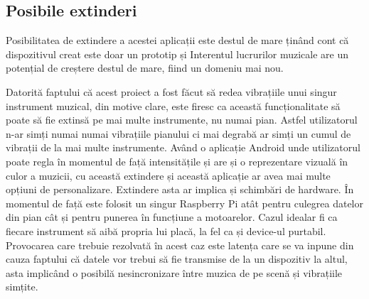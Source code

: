 \documentclass[../IoMusT.tex]{subfiles}
\begin{document}
\subsection{Posibile extinderi}
Posibilitatea de extindere a acestei aplicații este destul de mare ținând cont că dispozitivul creat este doar un prototip și Interentul lucrurilor muzicale are un potențial de creștere destul de mare, fiind un domeniu mai nou.
\\
\par Datorită faptului că acest proiect a fost făcut să redea vibrațiile unui singur instrument muzical, din motive clare, este firesc ca această funcționalitate să poate să fie extinsă pe mai multe instrumente, nu numai pian. Astfel utilizatorul n-ar simți numai numai vibrațiile pianului ci mai degrabă ar simți un cumul de vibrații de la mai multe instrumente. Având o aplicație Android unde utilizatorul poate regla în momentul de față intensitățile și are și o reprezentare vizuală în culor a muzicii, cu această extindere și această aplicație ar avea mai multe opțiuni de personalizare. Extindere asta ar implica și schimbări de hardware. În momentul de față este folosit un singur Raspberry Pi atât pentru culegrea datelor din pian cât și pentru punerea în funcțiune a motoarelor. Cazul idealar fi ca fiecare instrument să aibă propria lui placă, la fel ca și device-ul purtabil. Provocarea care trebuie rezolvată în acest caz este latența care se va inpune din cauza faptului că datele vor trebui să fie transmise de la un dispozitiv la altul, asta implicând o posibilă nesincronizare între muzica de pe scenă și vibrațiile simțite.
\end{document}
